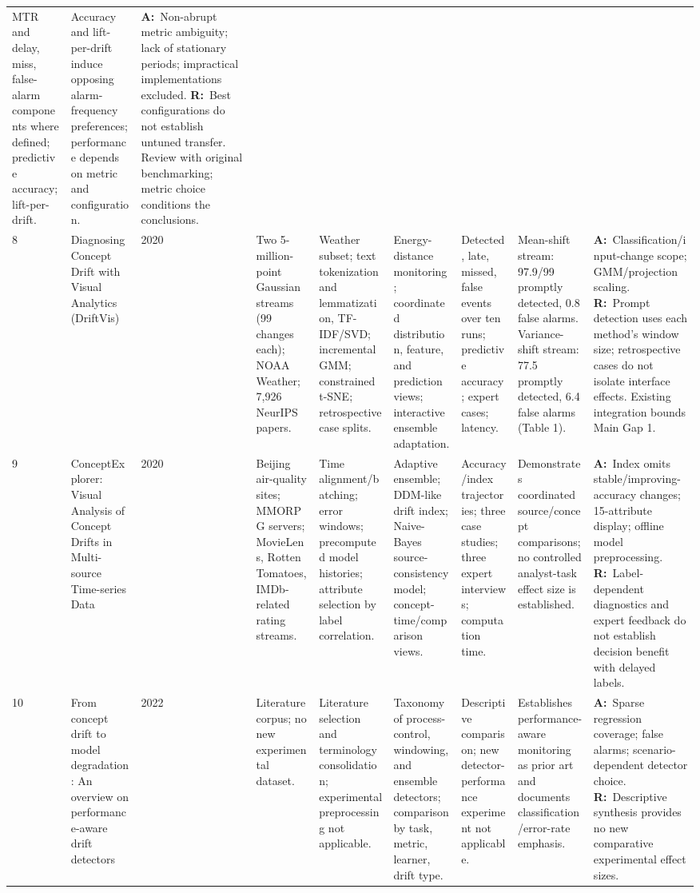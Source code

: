 \documentclass[10pt,a4paper]{article}
\newcommand{\A}{\textbf{A:}\ }
\newcommand{\R}{\textbf{R:}\ }
\begin{document}
\begin{landscape}
\begin{longtable}{L{0.4cm}L{3.5cm}L{0.95cm}L{2.55cm}L{2.65cm}L{2.65cm}L{2.25cm}L{2.65cm}L{3.8cm}}
MTR and delay, miss, false-alarm components where defined; predictive accuracy; lift-per-drift. &
Accuracy and lift-per-drift induce opposing alarm-frequency preferences; performance depends on metric and configuration. &
\A Non-abrupt metric ambiguity; lack of stationary periods; impractical implementations excluded.
\R Best configurations do not establish untuned transfer. Review with original benchmarking; metric choice conditions the conclusions.\\[4pt]
8 & Diagnosing Concept Drift with Visual Analytics (DriftVis) \cite{driftvis} &
2020 & Two 5-million-point Gaussian streams (99 changes each); NOAA Weather; 7,926 NeurIPS papers. &
Weather subset; text tokenization and lemmatization, TF-IDF/SVD; incremental GMM; constrained t-SNE; retrospective case splits. &
Energy-distance monitoring; coordinated distribution, feature, and prediction views; interactive ensemble adaptation. &
Detected, late, missed, false events over ten runs; predictive accuracy; expert cases; latency. &
Mean-shift stream: 97.9/99 promptly detected, 0.8 false alarms. Variance-shift stream: 77.5 promptly detected, 6.4 false alarms (Table 1). &
\A Classification/input-change scope; GMM/projection scaling.
\R Prompt detection uses each method's window size; retrospective cases do not isolate interface effects. Existing integration bounds Main Gap 1.\\[4pt]
9 & ConceptExplorer: Visual Analysis of Concept Drifts in Multi-source Time-series Data \cite{conceptexplorer} &
2020 & Beijing air-quality sites; MMORPG servers; MovieLens, Rotten Tomatoes, IMDb-related rating streams. &
Time alignment/batching; error windows; precomputed model histories; attribute selection by label correlation. &
Adaptive ensemble; DDM-like drift index; Naive-Bayes source-consistency model; concept-time/comparison views. &
Accuracy/index trajectories; three case studies; three expert interviews; computation time. &
Demonstrates coordinated source/concept comparisons; no controlled analyst-task effect size is established. &
\A Index omits stable/improving-accuracy changes; 15-attribute display; offline model preprocessing.
\R Label-dependent diagnostics and expert feedback do not establish decision benefit with delayed labels.\\[4pt]
10 & From concept drift to model degradation: An overview on performance-aware drift detectors \cite{bayram} &
2022 & Literature corpus; no new experimental dataset. &
Literature selection and terminology consolidation; experimental preprocessing not applicable. &
Taxonomy of process-control, windowing, and ensemble detectors; comparison by task, metric, learner, drift type. &
Descriptive comparison; new detector-performance experiment not applicable. &
Establishes performance-aware monitoring as prior art and documents classification/error-rate emphasis. &
\A Sparse regression coverage; false alarms; scenario-dependent detector choice.
\R Descriptive synthesis provides no new comparative experimental effect sizes.\\
\end{longtable}
\end{landscape}
\end{document}
